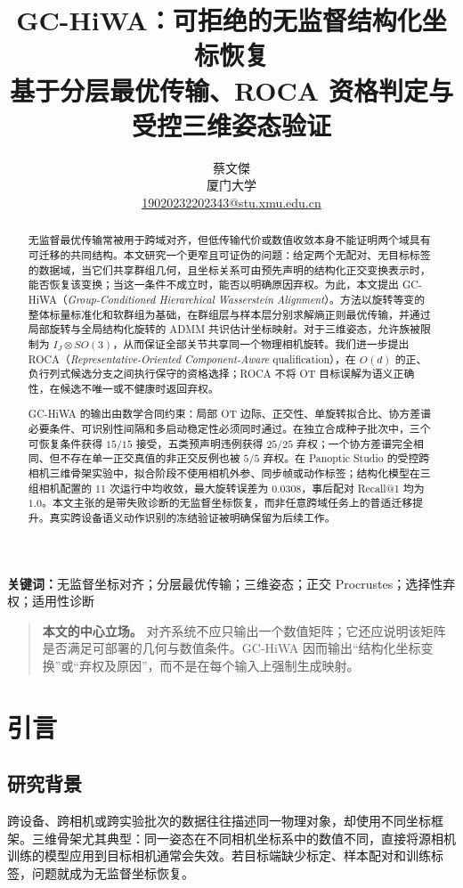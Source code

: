\documentclass[10pt,a4paper,fontset=windows]{ctexart}
\title{\textbf{GC-HiWA：可拒绝的无监督结构化坐标恢复}\\[0.45em]
\large 基于分层最优传输、ROCA 资格判定与受控三维姿态验证}
\author{蔡文傑\\厦门大学\\\href{mailto:19020232202343@stu.xmu.edu.cn}{19020232202343@stu.xmu.edu.cn}}
\date{}
\theoremstyle{definition}
\theoremstyle{remark}
\begin{document}
\maketitle

\begin{abstract}
无监督最优传输常被用于跨域对齐，但低传输代价或数值收敛本身不能证明两个域具有可迁移的共同结构。本文研究一个更窄且可证伪的问题：给定两个无配对、无目标标签的数据域，当它们共享群组几何，且坐标关系可由预先声明的结构化正交变换表示时，能否恢复该变换；当这一条件不成立时，能否以明确原因弃权。为此，本文提出 GC-HiWA（\emph{Group-Conditioned Hierarchical Wasserstein Alignment}）。方法以旋转等变的整体标量标准化和软群组为基础，在群组层与样本层分别求解熵正则最优传输，并通过局部旋转与全局结构化旋转的 ADMM 共识估计坐标映射。对于三维姿态，允许族被限制为 $I_J\otimes SO(3)$，从而保证全部关节共享同一个物理相机旋转。我们进一步提出 ROCA（\emph{Representative-Oriented Component-Aware} qualification），在 $O(d)$ 的正、负行列式候选分支之间执行保守的资格选择；ROCA 不将 OT 目标误解为语义正确性，在候选不唯一或不健康时返回弃权。

GC-HiWA 的输出由数学合同约束：局部 OT 边际、正交性、单旋转拟合比、协方差谱必要条件、可识别性间隔和多启动稳定性必须同时通过。在独立合成种子批次中，三个可恢复条件获得 $15/15$ 接受，五类预声明违例获得 $25/25$ 弃权；一个协方差谱完全相同、但不存在单一正交真值的非正交反例也被 $5/5$ 弃权。在 Panoptic Studio 的受控跨相机三维骨架实验中，拟合阶段不使用相机外参、同步帧或动作标签；结构化模型在三组相机配置的 11 次运行中均收敛，最大旋转误差为 $0.0308$，事后配对 Recall@1 均为 $1.0$。本文主张的是带失败诊断的无监督坐标恢复，而非任意跨域任务上的普适迁移提升。真实跨设备语义动作识别的冻结验证被明确保留为后续工作。
\end{abstract}

\noindent\textbf{关键词：}无监督坐标对齐；分层最优传输；三维姿态；正交 Procrustes；选择性弃权；适用性诊断

\begin{quote}\small
\textbf{本文的中心立场。} 对齐系统不应只输出一个数值矩阵；它还应说明该矩阵是否满足可部署的几何与数值条件。GC-HiWA 因而输出“结构化坐标变换”或“弃权及原因”，而不是在每个输入上强制生成映射。
\end{quote}

\section{引言}

\subsection{研究背景}
跨设备、跨相机或跨实验批次的数据往往描述同一物理对象，却使用不同坐标框架。三维骨架尤其典型：同一姿态在不同相机坐标系中的数值不同，直接将源相机训练的模型应用到目标相机通常会失效。若目标端缺少标定、样本配对和训练标签，问题就成为无监督坐标恢复。
\end{document}
